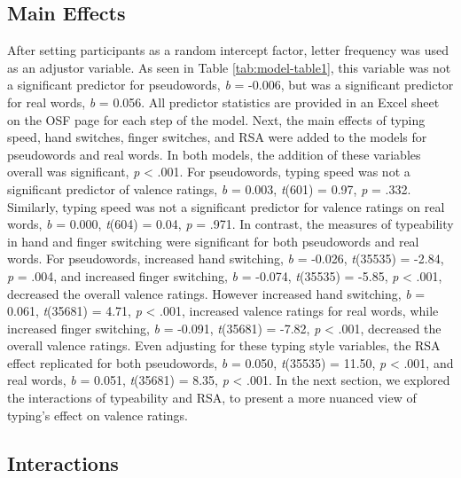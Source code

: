 \documentclass[english,man,man,mask]{apa6}
\theoremstyle{definition}
\theoremstyle{definition}
\theoremstyle{definition}
\theoremstyle{remark}
\begin{document}
\subsection{Main Effects}\label{main-effects}

After setting participants as a random intercept factor, letter
frequency was used as an adjustor variable. As seen in Table
\ref{tab:model-table1}, this variable was not a significant predictor
for pseudowords, \emph{b} = -0.006, but was a significant predictor for
real words, \emph{b} = 0.056. All predictor statistics are provided in
an Excel sheet on the OSF page for each step of the model. Next, the
main effects of typing speed, hand switches, finger switches, and RSA
were added to the models for pseudowords and real words. In both models,
the addition of these variables overall was significant, \emph{p}
\textless{} .001. For pseudowords, typing speed was not a significant
predictor of valence ratings, \emph{b} = 0.003, \emph{t}(601) = 0.97,
\emph{p} = .332. Similarly, typing speed was not a significant predictor
for valence ratings on real words, \emph{b} = 0.000, \emph{t}(604) =
0.04, \emph{p} = .971. In contrast, the measures of typeability in hand
and finger switching were significant for both pseudowords and real
words. For pseudowords, increased hand switching, \emph{b} = -0.026,
\emph{t}(35535) = -2.84, \emph{p} = .004, and increased finger
switching, \emph{b} = -0.074, \emph{t}(35535) = -5.85, \emph{p}
\textless{} .001, decreased the overall valence ratings. However
increased hand switching, \emph{b} = 0.061, \emph{t}(35681) = 4.71,
\emph{p} \textless{} .001, increased valence ratings for real words,
while increased finger switching, \emph{b} = -0.091, \emph{t}(35681) =
-7.82, \emph{p} \textless{} .001, decreased the overall valence ratings.
Even adjusting for these typing style variables, the RSA effect
replicated for both pseudowords, \emph{b} = 0.050, \emph{t}(35535) =
11.50, \emph{p} \textless{} .001, and real words, \emph{b} = 0.051,
\emph{t}(35681) = 8.35, \emph{p} \textless{} .001. In the next section,
we explored the interactions of typeability and RSA, to present a more
nuanced view of typing's effect on valence ratings.

\subsection{Interactions}\label{interactions}
\end{document}
